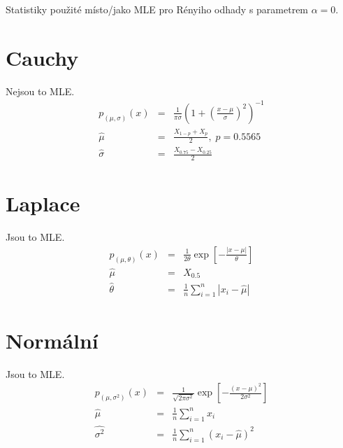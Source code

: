 \documentclass[11pt, a4paper]{article}
\begin{document}
Statistiky použité místo/jako MLE pro Rényiho odhady s parametrem $ \alpha = 0 $.

\section*{Cauchy}
Nejsou to MLE.
\begin{eqnarray}
p_{(\mu,\sigma)}(x) & = & \frac{1}{\pi \sigma} \left( 1 + \left( \frac{x - \mu}{\sigma} \right) ^2 \right)^{-1} \nonumber \\
\hat{\mu} & = & \frac{X_{1-p} + X_{p}}{2}, \; p = 0.5565 \nonumber \\
\hat{\sigma} & = & \frac{X_{0.75} - X_{0.25}}{2} \nonumber
\end{eqnarray}

\section*{Laplace}
Jsou to MLE.
\begin{eqnarray}
p_{(\mu,\theta)}(x) & = &  {\frac{1}{2\theta} \exp{ \left[ -\frac{|x -\mu |}{\theta } \right] }} \nonumber \\
\hat{\mu} & = & X_{0.5} \nonumber \\
\hat{\theta} & = & \frac{1}{n} \sum_{i=1}^n |x_i-\hat{\mu}| \nonumber
\end{eqnarray}

\section*{Normální}
Jsou to MLE.
\begin{eqnarray}
p_{(\mu,\sigma^2)}(x) & = &  {\frac{1}{\sqrt{2\pi\sigma^2}} \exp{ \left[ -\frac{(x -\mu )^2}{2\sigma^2} \right] }} \nonumber \\
\hat{\mu} & = & \frac{1}{n} \sum_{i=1}^n x_i  \nonumber \\
\hat{\sigma^2} & = & \frac{1}{n} \sum_{i=1}^n (x_i-\hat{\mu})^2 \nonumber
\end{eqnarray}
\end{document}

